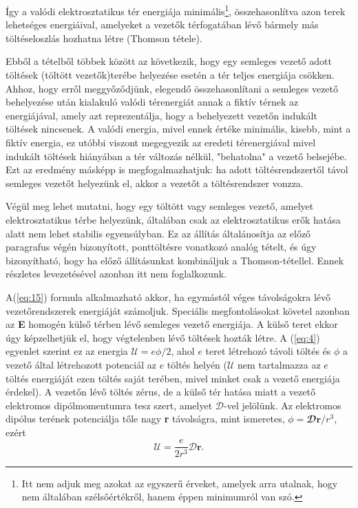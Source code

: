 \documentclass{article}
\begin{document}
Így a valódi elektrosztatikus tér energiája minimális\footnote[6]{Itt nem adjuk meg azokat az egyszerű érveket, amelyek arra utalnak, hogy nem általában szélsőértékről, hanem éppen minimumról van szó.}, összehasonlítva azon terek lehetséges energiáival, amelyeket a vezetők térfogatában lévő bármely más töltéseloszlás hozhatna létre (Thomson tétele).

Ebből a tételből többek között az következik, hogy egy semleges vezető adott töltések (töltött vezetők)terébe helyezése esetén a tér teljes energiája csökken. Ahhoz, hogy erről meggyőződjünk, elegendő összehasonlítani a semleges vezető behelyezése után kialakuló valódi térenergiát annak a fiktív térnek az energiájával, amely azt reprezentálja, hogy a behelyezett vezetőn indukált töltések nincsenek. A valódi energia, mivel ennek értéke minimális, kisebb, mint a fiktív energia, ez utóbbi viszont megegyezik az eredeti térenergiával mivel indukált töltések hiányában a tér változás nélkül, "behatolna" a vezető belsejébe. Ezt az eredmény másképp is megfogalmazhatjuk: ha adott töltésrendszertől távol semleges vezetőt helyezünk el, akkor a vezetőt a töltésrendszer vonzza.

Végül meg lehet mutatni, hogy egy töltött vagy semleges vezető, amelyet elektrosztatikus térbe helyezünk, általában csak az elektrosztatikus erők hatása alatt nem lehet stabilis egyensúlyban. Ez az állítás általánosítja az előző paragrafus végén bizonyított, ponttöltésre vonatkozó analóg tételt, és úgy bizonyítható, hogy ha előző állításunkat kombináljuk a Thomson-tétellel. Ennek részletes levezetésével azonban itt nem foglalkozunk.

A(\ref{eq:15}) formula alkalmazható akkor, ha egymástól véges távolságokra lévő vezetőrendszerek energiáját számoljuk. Speciális megfontolásokat követel azonban az \textbf{E} homogén külső térben lévő semleges vezető energiája. A külső teret ekkor úgy képzelhetjük el, hogy végtelenben lévő töltések hozták létre. A (\ref{eq:4}) egyenlet szerint ez
az energia $\mathcal{U} = e \phi /2$, ahol $e$ teret létrehozó távoli töltés és $\phi$ a vezető által létrehozott potenciál az $e$ töltés helyén ($\mathcal{U}$ nem tartalmazza az $e$ töltés energiáját ezen töltés saját terében, mivel minket csak a vezető energiája érdekel). A vezetőn lévő töltés zérus, de a külső tér hatása miatt a vezető elektromos dipólmomentumra tesz szert, amelyet $\mathcal{D}$-vel jelölünk. Az elektromos dipólus terének potenciálja tőle nagy \textbf{r} távolságra, mint ismeretes, $\phi = \mathbfcal{D}\textbf{r}/r^3$, ezért
\begin{equation} \label{eq:21}
    \mathcal{U} = \frac{e}{2r^3} \mathcal{D}\textbf{r}.
\end{equation}
\end{document}

